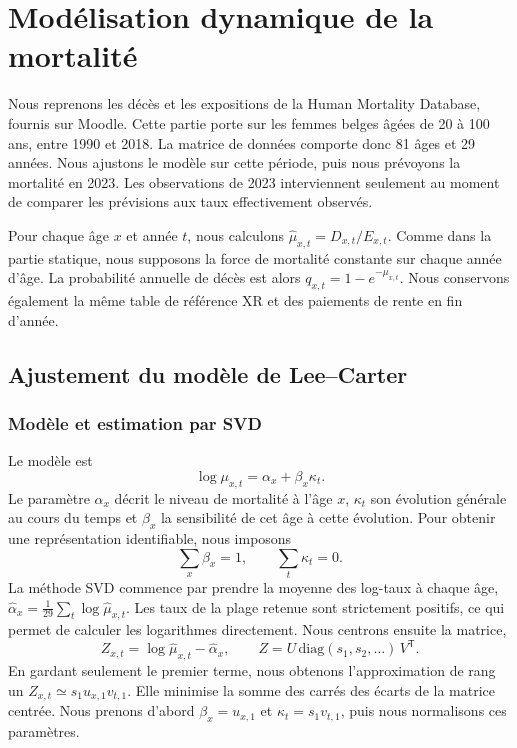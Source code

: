 \documentclass[11pt,a4paper]{article}
\begin{document}
\setcounter{section}{1}
\section{Modélisation dynamique de la mortalité}

Nous reprenons les décès et les expositions de la Human Mortality Database, fournis sur Moodle. Cette partie porte sur les femmes belges âgées de 20 à 100 ans, entre 1990 et 2018. La matrice de données comporte donc 81 âges et 29 années. Nous ajustons le modèle sur cette période, puis nous prévoyons la mortalité en 2023. Les observations de 2023 interviennent seulement au moment de comparer les prévisions aux taux effectivement observés.

Pour chaque âge $x$ et année $t$, nous calculons $\widehat\mu_{x,t}=D_{x,t}/E_{x,t}$. Comme dans la partie statique, nous supposons la force de mortalité constante sur chaque année d'âge. La probabilité annuelle de décès est alors $q_{x,t}=1-e^{-\mu_{x,t}}$. Nous conservons également la même table de référence XR et des paiements de rente en fin d'année.

\subsection{Ajustement du modèle de Lee--Carter}
\subsubsection{Modèle et estimation par SVD}

Le modèle est
\[
\log\mu_{x,t}=\alpha_x+\beta_x\kappa_t.
\]
Le paramètre $\alpha_x$ décrit le niveau de mortalité à l'âge $x$, $\kappa_t$ son évolution générale au cours du temps et $\beta_x$ la sensibilité de cet âge à cette évolution. Pour obtenir une représentation identifiable, nous imposons
\[
\sum_x\beta_x=1,\qquad \sum_t\kappa_t=0.
\]
La méthode SVD commence par prendre la moyenne des log-taux à chaque âge,
$\widehat\alpha_x=\frac1{29}\sum_t\log\widehat\mu_{x,t}$. Les taux de la plage retenue sont strictement positifs, ce qui permet de calculer les logarithmes directement. Nous centrons ensuite la matrice,
\[
Z_{x,t}=\log\widehat\mu_{x,t}-\widehat\alpha_x,
\qquad Z=U\,\mathrm{diag}(s_1,s_2,\ldots)\,V^{\mathsf T}.
\]
En gardant seulement le premier terme, nous obtenons l'approximation de rang un $Z_{x,t}\simeq s_1u_{x,1}v_{t,1}$. Elle minimise la somme des carrés des écarts de la matrice centrée. Nous prenons d'abord $\beta_x=u_{x,1}$ et $\kappa_t=s_1v_{t,1}$, puis nous normalisons ces paramètres.
\end{document}
